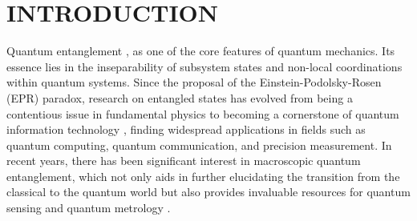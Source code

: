 \documentclass[
aps,
reprint,
superscriptaddress,
amsmath,amssymb,
pra
]{revtex4-2}
\begin{document}
\section{INTRODUCTION}
Quantum entanglement \cite{RevModPhys.81.865}, as one of the core features of quantum mechanics. Its essence lies in the inseparability of subsystem states and non-local coordinations within quantum systems. Since the proposal of the Einstein-Podolsky-Rosen (EPR) paradox, research on entangled states has evolved from being a contentious issue in fundamental physics to becoming a cornerstone of quantum information technology \cite{RevModPhys.77.513}, finding widespread applications in fields such as quantum computing, quantum communication, and precision measurement. In recent years, there has been significant interest in macroscopic quantum entanglement, which not only aids in further elucidating the transition from the classical to the quantum world \cite{PhysRevLett.93.190402, PhysRevLett.97.237201, poot2012mechanical} but also provides invaluable resources for quantum sensing and quantum metrology \cite{barzanjeh2022optomechanics, RevModPhys.90.025004}. 
\end{document}
